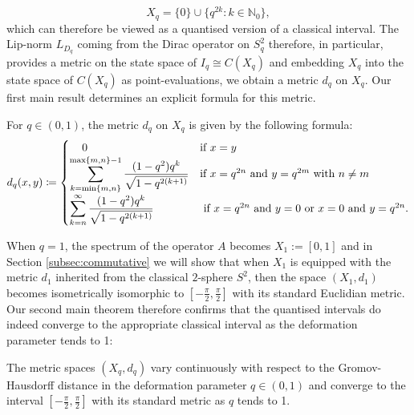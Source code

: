 \documentclass[11pt, reqno, a4paper, final]{amsart}
\theoremstyle{plain}
\theoremstyle{definition}
\newcommand{\NN}{{\mathbb N}}
\renewcommand{\min}{{\operatorname{min}}}
\newcommand{\black}{\color{black}}
\begin{document}
$$X_q=\lbrace 0 \rbrace \cup \lbrace q^{2k} \colon k\in \NN_0 \rbrace,$$
which can therefore be viewed as a quantised version of a classical interval. The Lip-norm $L_{D_q}$ coming from the Dirac operator on $S_q^2$ therefore, in particular, provides a metric on the state space of $I_q\cong C(X_q)$ and embedding $X_q$ into the state space of $C(X_q)$ as point-evaluations, we obtain a metric $d_q$ on $X_q$. Our first main result determines an explicit formula for this metric.


\begin{theoremletter}
\label{Theorem:Lip-Lip}
For $q\in (0,1)$, the metric $d_q$ on $X_q$ is given by the following formula:
\begin{align*}
d_q(x,y)\coloneqq
\begin{cases} \hspace{0.4cm }0 &\mbox{if } x=y \\
 \displaystyle\sum_{k=\min\lbrace m,n \rbrace}^{\max\lbrace m,n \rbrace-1} \frac{(1-q^2)q^k}{\sqrt{1-q^{2(k+1)}}} & \mbox{if } x= {\black q^{2n}} \text{ and } y={\black q^{2m}}  \text{ with } n\neq m \\
 \displaystyle\sum_{k=n}^\infty \frac{(1-q^2)q^k}{\sqrt{1-q^{2(k+1)}}} & \text{ if } x={\black q^{2n}} \text{ and } y=0 \text{ or } x=0 \text{ and } y={\black q^{2n}}. 
  \end{cases}
\end{align*}
\end{theoremletter}
 
When $q=1$, the spectrum of the operator $A$ becomes $X_1:=[0,1]$ and in Section \ref{subsec:commutative} we will show that when $X_1$ is equipped with the metric $d_1$  inherited from the classical $2$-sphere $S^2$, then the space $(X_1,d_1)$ becomes isometrically isomorphic to $[-\frac{\pi}{2}, \frac{\pi}{2}]$ with its standard Euclidian metric.  Our second main theorem therefore confirms that the quantised intervals do indeed converge to the appropriate classical interval as the deformation parameter tends to 1: 






\begin{theoremletter}
\label{Theorem:Cont}
The metric spaces $(X_q,d_q)$ vary continuously with respect to the Gromov-Hausdorff distance in the deformation parameter $q\in (0,1)$ and converge to  
the interval $\left[-\tfrac{\pi}{2},\tfrac{\pi}{2}\right]$ with its standard metric as $q$ tends to 1.

\end{theoremletter}
\end{document}
